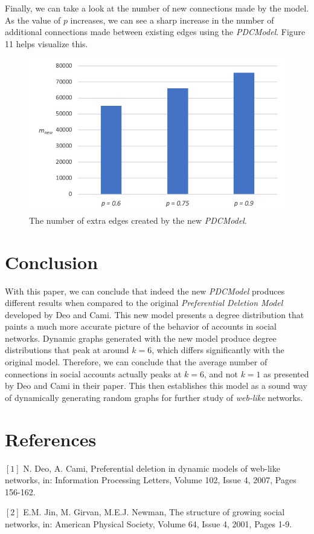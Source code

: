 \documentclass[final,3p,times,twocolumn]{elsarticle}
\begin{document}
Finally, we can take a look at the number of new connections made by the model. As the value of $p$ increases, we can see a sharp increase in the number of additional connections made between existing edges using the \textit{PDCModel}. Figure 11 helps visualize this.

\begin{figure}[h]
\centering\includegraphics[width=1\linewidth]{edges-growth.png}
\caption{The number of extra edges created by the new \textit{PDCModel}.}

\end{figure}

\section{Conclusion}
\label{S:10}

With this paper, we can conclude that indeed the new \textit{PDCModel} produces different results when compared to the original \textit{Preferential Deletion Model} developed by Deo and Cami. This new model presents a degree distribution that paints a much more accurate picture of the behavior of accounts in social networks. Dynamic graphs generated with the new model produce degree distributions that peak at around $k = 6$, which differs significantly with the original model. Therefore, we can conclude that the average number of connections in social accounts actually peaks at $k = 6$, and not $k = 1$ as presented by Deo and Cami in their paper. This then establishes this model as a sound way of dynamically generating random graphs for further study of \textit{web-like} networks.

\section{References}
\label{S:11}

$[1]$ N. Deo, A. Cami, Preferential deletion in dynamic models of web-like networks, in: Information Processing Letters, Volume 102, Issue 4, 2007, Pages 156-162.

$[2]$ E.M. Jin, M. Girvan, M.E.J. Newman, The structure of growing social networks, in: American Physical Society, Volume 64, Issue 4, 2001, Pages 1-9.
\end{document}
